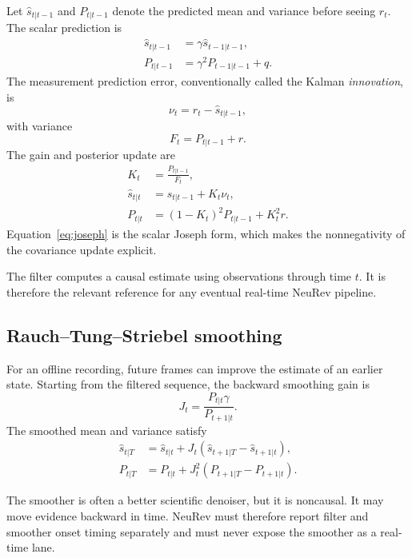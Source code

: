 \documentclass[11pt]{article}
\begin{document}
Let
\(\widehat s_{t|t-1}\) and \(P_{t|t-1}\) denote the predicted mean and
variance before seeing \(r_t\). The scalar prediction is
\begin{align}
\widehat s_{t|t-1}
&=
\gamma\widehat s_{t-1|t-1},\\
P_{t|t-1}
&=
\gamma^2P_{t-1|t-1}+q.
\end{align}
The measurement prediction error, conventionally called the Kalman
\emph{innovation}, is
\begin{equation}
\nu_t
=
r_t-\widehat s_{t|t-1},
\end{equation}
with variance
\begin{equation}
F_t=P_{t|t-1}+r.
\end{equation}
The gain and posterior update are
\begin{align}
K_t&=\frac{P_{t|t-1}}{F_t},\\
\widehat s_{t|t}
&=
\widehat s_{t|t-1}+K_t\nu_t,\\
P_{t|t}
&=
(1-K_t)^2P_{t|t-1}+K_t^2r.
\label{eq:joseph}
\end{align}
Equation~\eqref{eq:joseph} is the scalar Joseph form, which makes the
nonnegativity of the covariance update explicit.

The filter computes a causal estimate using observations through time \(t\).
It is therefore the relevant reference for any eventual real-time NeuRev
pipeline.

\subsection{Rauch--Tung--Striebel smoothing}

For an offline recording, future frames can improve the estimate of an earlier
state. Starting from the filtered sequence, the backward smoothing gain is
\begin{equation}
J_t
=
\frac{P_{t|t}\gamma}{P_{t+1|t}}.
\end{equation}
The smoothed mean and variance satisfy
\begin{align}
\widehat s_{t|T}
&=
\widehat s_{t|t}
+
J_t
\left(
\widehat s_{t+1|T}-\widehat s_{t+1|t}
\right),\\
P_{t|T}
&=
P_{t|t}
+
J_t^2
\left(
P_{t+1|T}-P_{t+1|t}
\right).
\end{align}

The smoother is often a better scientific denoiser, but it is noncausal. It may
move evidence backward in time. NeuRev must therefore report filter and smoother
onset timing separately and must never expose the smoother as a real-time lane.
\end{document}
